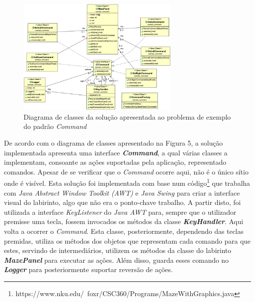 \documentclass[10pt,portuguese]{article}
\begin{document}
\begin{figure}[!h]
    \centering
    \includegraphics[width=300]{images/command/UML_Example.png}
    \caption{Diagrama de classes da solução apresentada ao problema de exemplo do padrão \textit{Command}}
\end{figure}

\par De acordo com o diagrama de classes apresentado na Figura 5, a solução implementada apresenta uma interface \textbf{\textit{Command}}, a qual várias classes a implementam, consoante as ações suportadas pela aplicação, representado comandos. Apesar de se verificar que o \textit{Command} ocorre aqui, não é o único sítio onde é visível. Esta solução foi implementada com base num código\footnote{https://www.nku.edu/~foxr/CSC360/Programs/MazeWithGraphics.java} que trabalha com \textit{Java Abstract Window Toolkit (AWT)} e \textit{Java Swing} para criar a interface visual do labirinto, algo que não era o ponto-chave trabalho. A partir disto, foi utilizada a interface \textit{KeyListener} do \textit{Java AWT} para, sempre que o utilizador premisse uma tecla, fossem invocados os métodos da classe \textbf{\textit{KeyHandler}}. Aqui volta a ocorrer o \textit{Command}. Esta classe, posteriormente, dependendo das teclas premidas, utiliza os métodos dos objetos que representam cada comando para que estes, servindo de intermediários, utilizem os métodos da classe do labirinto \textbf{\textit{MazePanel}} para executar as ações. Além disso, guarda esses comando no \textbf{\textit{Logger}} para posteriormente suportar reversão de ações.

\clearpage
\end{document}
